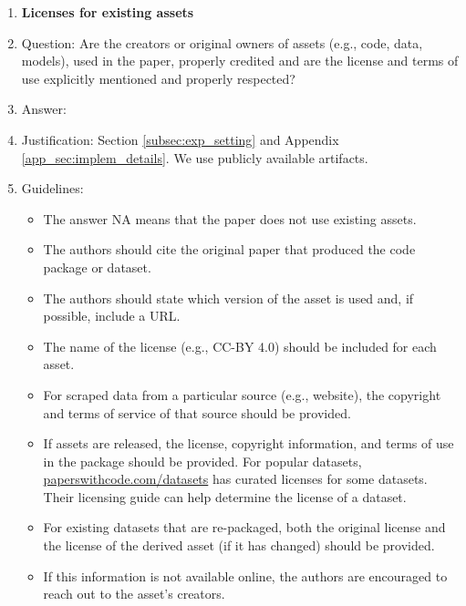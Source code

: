 \documentclass{article}
\begin{document}
\begin{enumerate}
\item {\bf Licenses for existing assets}
    \item[] Question: Are the creators or original owners of assets (e.g., code, data, models), used in the paper, properly credited and are the license and terms of use explicitly mentioned and properly respected?
    \item[] Answer: \answerYes{} %
    \item[] Justification: Section \ref{subsec:exp_setting} and Appendix \ref{app_sec:implem_details}. We use publicly available artifacts.
    \item[] Guidelines:
    \begin{itemize}
        \item The answer NA means that the paper does not use existing assets.
        \item The authors should cite the original paper that produced the code package or dataset.
        \item The authors should state which version of the asset is used and, if possible, include a URL.
        \item The name of the license (e.g., CC-BY 4.0) should be included for each asset.
        \item For scraped data from a particular source (e.g., website), the copyright and terms of service of that source should be provided.
        \item If assets are released, the license, copyright information, and terms of use in the package should be provided. For popular datasets, \url{paperswithcode.com/datasets} has curated licenses for some datasets. Their licensing guide can help determine the license of a dataset.
        \item For existing datasets that are re-packaged, both the original license and the license of the derived asset (if it has changed) should be provided.
        \item If this information is not available online, the authors are encouraged to reach out to the asset's creators.
    \end{itemize}


\end{enumerate}
\end{document}
